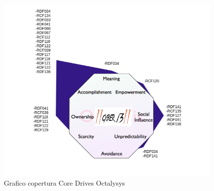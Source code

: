 \begin{figure}[h!]
\begin{center}
  \includegraphics[scale=0.8]{immagini/Octalysys.png}
  \caption{Grafico copertura Core Drives Octalysys}
  \end{center}
\end{figure}



